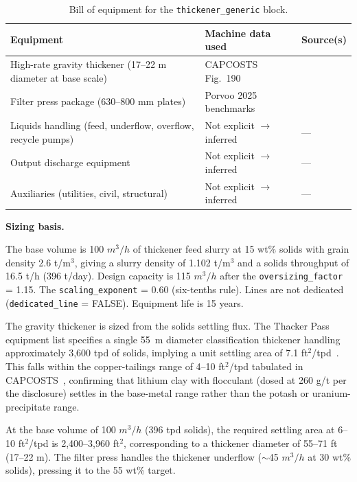 \begin{table}[h!]
\caption{Bill of equipment for the \texttt{thickener\_generic} block.}
\centering
\begin{tabular}{>{\raggedright\arraybackslash}p{5.2cm}
				>{\raggedright\arraybackslash}p{4cm}
				>{\raggedright\arraybackslash}p{4.5cm}}
\toprule
\textbf{Equipment} & \textbf{Machine data used} & \textbf{Source(s)} \\
\midrule
High-rate gravity thickener (17--22 m diameter at base scale) & CAPCOSTS Fig.~190 & \citet{mularCAPCOSTS1998} \\
Filter press package (630--800 mm plates) & Porvoo 2025 benchmarks & \citet{porvooFilterPressCost2025} \\
Liquids handling (feed, underflow, overflow, recycle pumps) & Not explicit $\rightarrow$ inferred & --- \\
Output discharge equipment & Not explicit $\rightarrow$ inferred & --- \\
Auxiliaries (utilities, civil, structural) & Not explicit $\rightarrow$ inferred & --- \\
\bottomrule
\end{tabular}
\end{table}

\medskip
\noindent\textbf{Sizing basis.}\quad

The base volume is 100 $\si{m^3/h}$ of thickener feed slurry at 15 wt\% solids with grain density 2.6 t/m$^3$, giving a slurry density of 1.102 t/m$^3$ and a solids throughput of 16.5 t/h (396 t/day). Design capacity is 115 $\si{m^3/h}$ after the \texttt{oversizing\_factor} = 1.15. The \texttt{scaling\_exponent} = 0.60 (six-tenths rule). Lines are not dedicated (\texttt{dedicated\_line} = FALSE). Equipment life is 15 years.

The gravity thickener is sized from the solids settling flux. The Thacker Pass equipment list specifies a single 55~m diameter classification thickener handling approximately 3,600 tpd of solids, implying a unit settling area of 7.1 ft$^2$/tpd~\citep{sgscanadaincSK1300Technical2024}. This falls within the copper-tailings range of 4--10 ft$^2$/tpd tabulated in CAPCOSTS~\citep[p.~270]{mularCAPCOSTS1998}, confirming that lithium clay with flocculant (dosed at 260 g/t per the disclosure) settles in the base-metal range rather than the potash or uranium-precipitate range.

At the base volume of 100 $\si{m^3/h}$ (396 tpd solids), the required settling area at 6--10 ft$^2$/tpd is 2,400--3,960 ft$^2$, corresponding to a thickener diameter of 55--71 ft (17--22 m). The filter press handles the thickener underflow ($\sim$45 $\si{m^3/h}$ at 30 wt\% solids), pressing it to the 55 wt\% target.

